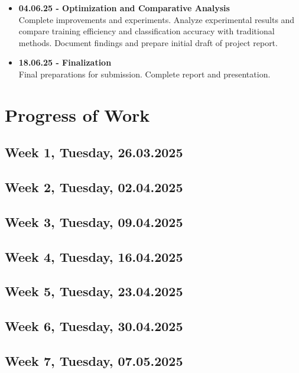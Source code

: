 \documentclass[12pt,fleqn,a4paper]{article}
\begin{document}
\begin{itemize}
\item{\textbf{04.06.25 - Optimization and Comparative Analysis} \\ Complete improvements and experiments. Analyze experimental results and compare training efficiency and classification accuracy with traditional methods. Document findings and prepare initial draft of project report.}

\item{\textbf{18.06.25 - Finalization} \\ Final preparations for submission. Complete report and presentation.}

\end{itemize}

\newpage

\section{Progress of Work} %

\subsection{Week 1, Tuesday, 26.03.2025}

\subsection{Week 2, Tuesday, 02.04.2025}

\subsection{Week 3, Tuesday, 09.04.2025}

\subsection{Week 4, Tuesday, 16.04.2025}

\subsection{Week 5, Tuesday, 23.04.2025}

\subsection{Week 6, Tuesday, 30.04.2025}

\subsection{Week 7, Tuesday, 07.05.2025}
\end{document}
